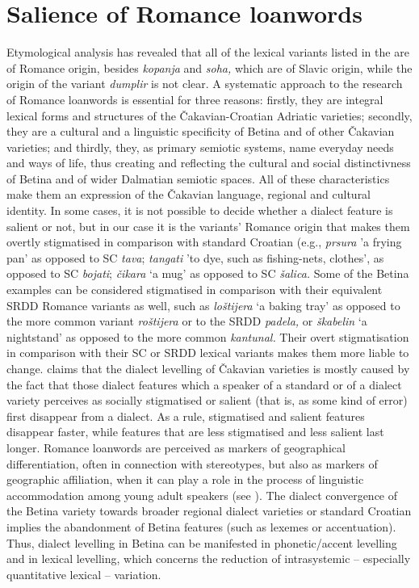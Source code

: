 \documentclass[output=paper]{LSP/langsci}
\begin{document}
\section{Salience of Romance loanwords}
Etymological analysis has revealed that all of the lexical variants listed in the  are of Romance origin, besides \textit{kopanja }and \textit{soha, }which are of Slavic origin, while the origin of the variant \textit{dumplir }is not clear. A systematic approach to the research of Romance loanwords is essential for three reasons: firstly, they are integral lexical forms and structures of the Čakavian-Croatian Adriatic varieties; secondly, they are a cultural and a linguistic specificity of Betina and of other Čakavian varieties; and thirdly, they, as primary semiotic systems, name everyday needs and ways of life, thus creating and reflecting the cultural and social distinctivness of Betina and of wider Dalmatian semiotic spaces. All of these characteristics make them an expression of the Čakavian language, regional and cultural identity. In some cases, it is not possible to decide whether a dialect feature is salient or not, but in our case it is the variants’ Romance origin that makes them overtly stigmatised in comparison with standard Croatian (e.g., \textit{prsura} 'a frying pan' as opposed to SC \textit{tava}; \textit{tangati} 'to dye, such as fishing-nets, clothes’, as opposed to SC \textit{bojati}; \textit{čikara }‘a mug’ as opposed to SC \textit{šalica. }Some of the Betina examples can be considered stigmatised in comparison with their equivalent SRDD Romance variants as well, such as \textit{loštijera }‘a baking tray’ as opposed to the more common variant \textit{roštijera} or to the SRDD \textit{padela, }or\textit{ škabelin }‘a nightstand’ as opposed to the more common \textit{kantunal. }Their overt stigmatisation in comparison with their SC or SRDD lexical variants makes them more liable to change. \citet[30--32]{jutronic_spliski_2010} claims that the dialect levelling of Čakavian varieties is mostly caused by the fact that those dialect features which a speaker of a standard or of a dialect variety perceives as socially stigmatised or salient (that is, as some kind of error) first disappear from a dialect. As a rule, stigmatised and salient features disappear faster, while features that are less stigmatised and less salient last longer. Romance loanwords are perceived as markers of geographical differentiation, often in connection with stereotypes, but also as markers of geographic affiliation, when it can play a role in the process of linguistic accommodation among young adult speakers (see \citealt[44--45]{auer_study_2004}). The dialect convergence of the Betina variety towards broader regional dialect varieties or standard Croatian implies the abandonment of Betina features (such as lexemes or accentuation). Thus, dialect levelling in Betina can be manifested in phonetic/accent levelling and in lexical levelling, which concerns the reduction of intrasystemic – especially quantitative lexical – variation.
\end{document}
